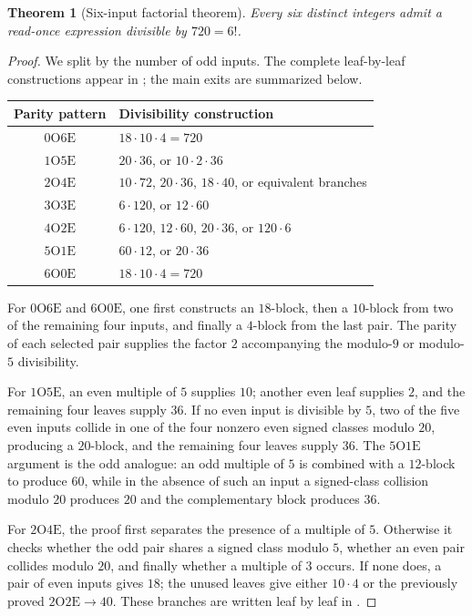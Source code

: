 \documentclass[11pt]{amsart}
\newtheorem{theorem}{Theorem}[section]
\theoremstyle{definition}
\theoremstyle{remark}
\newcommand{\OO}{\mathrm O}
\newcommand{\EE}{\mathrm E}
\begin{document}
\begin{theorem}[Six-input factorial theorem]\label{thm:six720}
Every six distinct integers admit a read-once expression divisible by
$720=6!$.
\end{theorem}
\begin{proof}
We split by the number of odd inputs.  The complete leaf-by-leaf
constructions appear in ; the main exits are summarized below.

\begin{center}
\begin{tabular}{@{}cl@{}}
\toprule
Parity pattern & Divisibility construction \\
\midrule
$0\OO6\EE$ & $18\cdot10\cdot4=720$ \\
$1\OO5\EE$ & $20\cdot36$, or $10\cdot2\cdot36$ \\
$2\OO4\EE$ & $10\cdot72$, $20\cdot36$, $18\cdot40$, or equivalent branches \\
$3\OO3\EE$ & $6\cdot120$, or $12\cdot60$ \\
$4\OO2\EE$ & $6\cdot120$, $12\cdot60$, $20\cdot36$, or $120\cdot6$ \\
$5\OO1\EE$ & $60\cdot12$, or $20\cdot36$ \\
$6\OO0\EE$ & $18\cdot10\cdot4=720$ \\
\bottomrule
\end{tabular}
\end{center}

For $0\OO6\EE$ and $6\OO0\EE$, one first constructs an $18$-block,
then a $10$-block from two of the remaining four inputs, and finally a
$4$-block from the last pair.  The parity of each selected pair supplies the
factor $2$ accompanying the modulo-$9$ or modulo-$5$ divisibility.

For $1\OO5\EE$, an even multiple of $5$ supplies $10$; another even leaf
supplies $2$, and the remaining four leaves supply $36$.  If no even input
is divisible by $5$, two of the five even inputs collide in one of the four
nonzero even signed classes modulo $20$, producing a $20$-block, and the
remaining four leaves supply $36$.  The $5\OO1\EE$ argument is the odd
analogue: an odd multiple of $5$ is combined with a $12$-block to produce
$60$, while in the absence of such an input a signed-class collision modulo
$20$ produces $20$ and the complementary block produces $36$.

For $2\OO4\EE$, the proof first separates the presence of a multiple of
$5$.  Otherwise it checks whether the odd pair shares a signed class modulo
$5$, whether an even pair collides modulo $20$, and finally whether a
multiple of $3$ occurs.  If none does, a pair of even inputs gives $18$;
the unused leaves give either $10\cdot4$ or the previously proved
$2\OO2\EE\to40$.  These branches are written leaf by leaf in
.


\end{proof}
\end{document}
